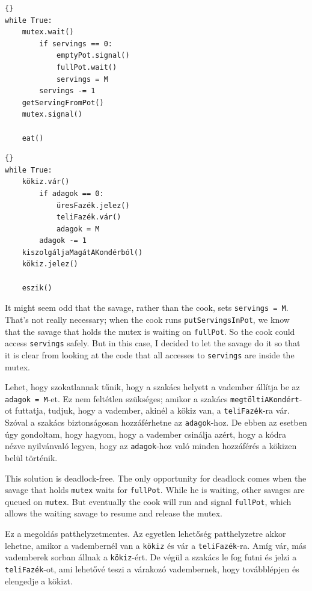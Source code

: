 \documentclass{book}
\begin{document}
\begin{lstlisting}[title={Dining Savages solution (savage)}]{}
while True:
    mutex.wait()
        if servings == 0:
            emptyPot.signal()
            fullPot.wait()
            servings = M
        servings -= 1
	getServingFromPot()
    mutex.signal()

    eat()
\end{lstlisting}

\begin{lstlisting}[title={Étkező vademberek megoldás (vadember)}]{}
while True:
    kökiz.vár()
        if adagok == 0:
            üresFazék.jelez()
            teliFazék.vár()
            adagok = M
        adagok -= 1
	kiszolgáljaMagátAKondérból()
    kökiz.jelez()

    eszik()
\end{lstlisting}

It might seem odd that the savage, rather than the cook, sets
{\tt servings = M}.  That's not really necessary; when the cook
runs {\tt putServingsInPot}, we know that the savage that holds
the mutex is waiting on {\tt fullPot}.  So the cook could
access {\tt servings} safely.  But in this case, I decided to
let the savage do it so that it is clear from looking at the
code that all accesses to {\tt servings} are inside the mutex.

Lehet, hogy szokatlannak tűnik, hogy a szakács helyett a vadember
állítja be az {\tt adagok = M}-et. Ez nem feltétlen szükséges; amikor
a szakács {\tt megtöltiAKondért}-ot futtatja, tudjuk, hogy a vadember,
akinél a kökiz van, a {\tt teliFazék}-ra vár. Szóval a szakács biztonságosan
hozzáférhetne az {\tt adagok}-hoz. De ebben az esetben úgy gondoltam,
hogy hagyom, hogy a vadember csinálja azért, hogy a kódra nézve
nyilvánvaló legyen, hogy az {\tt adagok}-hoz való minden hozzáférés
a kökizen belül történik.

This solution is deadlock-free.  The only opportunity for
deadlock comes when the savage that holds {\tt mutex} waits
for {\tt fullPot}.  While he is waiting, other savages are
queued on {\tt mutex}.  But eventually the cook will run and
signal {\tt fullPot}, which allows the waiting savage
to resume and release the mutex.

Ez a megoldás patthelyzetmentes. Az egyetlen
lehetőség patthelyzetre akkor lehetne, amikor a
vadembernél van a {\tt kökiz} és vár a {\tt teliFazék}-ra. Amíg vár, más
vademberek sorban állnak a {\tt kökiz}-ért. De végül a szakács le fog
futni és jelzi a {\tt teliFazék}-ot, ami lehetővé teszi a várakozó
vadembernek, hogy továbblépjen és elengedje a kökizt.
\end{document}
